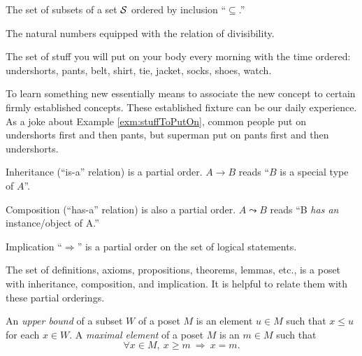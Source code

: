 \begin{exm}
  The set of subsets of a set ${\cal S}$
  ordered by inclusion ``$\subseteq$.''
\end{exm}

\begin{exm}
  The natural numbers equipped with the relation of divisibility.
\end{exm}

\begin{exm}
  \label{exm:stuffToPutOn}
  The set of stuff you will put on your body every morning
  with the time ordered:
  undershorts, pants, belt, shirt, tie, jacket,
  socks, shoes, watch.
\end{exm}

\begin{rem}
  To learn something new essentially means
  to associate the new concept to certain firmly established concepts.
  These established fixture can be our daily experience.
  As a joke about Example \ref{exm:stuffToPutOn},
  common people put on undershorts first and then pants,
  but superman put on pants first and then undershorts.
\end{rem}

\begin{exm}
   \label{exm:inheritance}
  Inheritance (``is-a'' relation) is a partial order.
  $A \rightarrow B$ reads ``$B$ is a special type of $A$''.
\end{exm}

\begin{exm}
   \label{exm:composition}
  Composition (``has-a'' relation) is also a partial order.
  $A \leadsto B$ reads
  ``B \emph{has an} instance/object of A.''
\end{exm}

\begin{exm}
  Implication ``$\Rightarrow$''
  is a partial order on the set of logical statements.
\end{exm}

\begin{exm}
  The set of definitions, axioms,
  propositions, theorems, lemmas, etc., 
  is a poset with inheritance, composition, and implication.
  It is helpful to relate them with these partial orderings.
\end{exm}

\begin{defn}
  \label{def:UpperBoundAndMaximalElementOfPoset}
  An \emph{upper bound} of a subset $W$ of a poset $M$
  is an element $u\in M$ such that
  $x\le u$ for each $x\in W$.
  A \emph{maximal element} of a poset $M$
  is an $m\in M$ such that
  \begin{equation}
    \label{eq:maximalElementOfPoset}
    \forall x\in M,\ x\ge m \ \Rightarrow\ x=m.
  \end{equation}
\end{defn}

